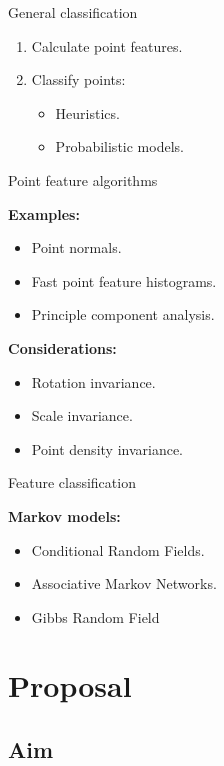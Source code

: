 \documentclass{beamer}
\begin{document}
\begin{frame}{General classification}

\begin{enumerate}
\item Calculate point features.
\item Classify points:
\begin{itemize}
\item Heuristics.
\item Probabilistic models.
\end{itemize}
\end{enumerate}

\end{frame}

\begin{frame}{Point feature algorithms}

\textbf{Examples:}
\begin{itemize}
\item Point normals.
\item Fast point feature histograms.
\item Principle component analysis.
\end{itemize}

\textbf{Considerations:}
\begin{itemize}
\item Rotation invariance.
\item Scale invariance.
\item Point density invariance.
\end{itemize}

\end{frame}

\begin{frame}{Feature classification}

\textbf{Markov models:}
\begin{itemize}
\item Conditional Random Fields.
\item Associative Markov Networks.
\item Gibbs Random Field
\end{itemize}

\end{frame}

\section{Proposal}

\subsection{Aim}
\end{document}
